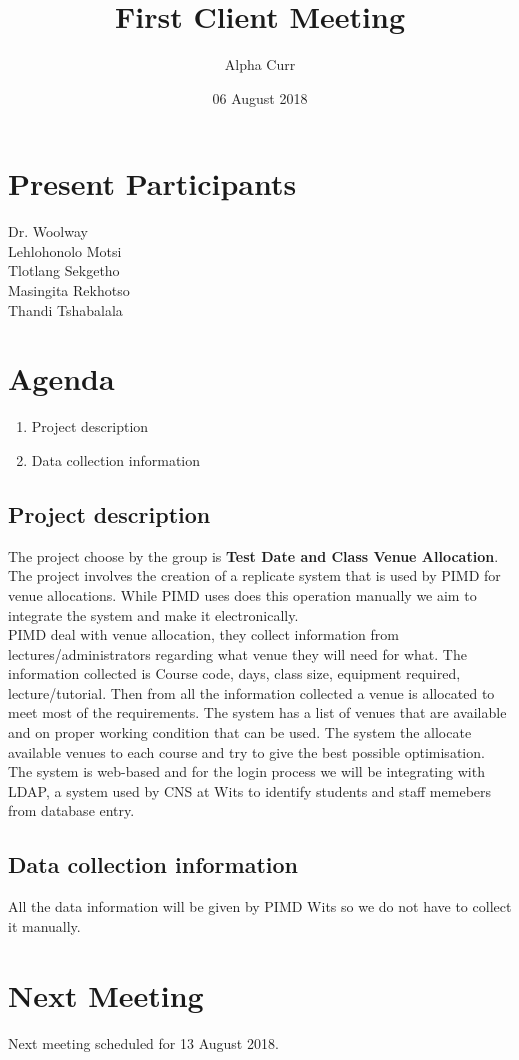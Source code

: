 \documentclass[11pt]{article}
\title{First Client Meeting}
\author{Alpha Curr}
\date{06 August 2018}
\begin{document}
\maketitle

\section{Present Participants}
Dr. Woolway \\
Lehlohonolo Motsi \\
Tlotlang Sekgetho \\
Masingita Rekhotso \\
Thandi Tshabalala

\section{Agenda}
\begin{enumerate}
\item Project description
\item Data collection information
\end{enumerate}

\subsection{Project description}
The project choose by the group is \textbf{Test Date and Class Venue Allocation}.\\
The project involves the creation of a replicate system that is used by PIMD for venue allocations. While PIMD uses does this operation manually we aim to integrate the system and make it electronically.\\
\newline
PIMD deal with venue allocation, they collect information from lectures/administrators regarding what venue they will need for what. The information collected is Course code, days, class size, equipment required, lecture/tutorial. Then from all the information collected a venue is allocated to meet most of the requirements. The system has a list of venues that are available and on proper working condition that can be used. The system the allocate available venues to each course and try to give the best possible optimisation.\\
The system is web-based and for the login process we will be integrating with LDAP, a system used by CNS at Wits to identify students and staff memebers from database entry.

\subsection{Data collection information}
All the data information will be given by PIMD Wits so we do not have to collect it manually.

\section{Next Meeting}
Next meeting scheduled for 13 August 2018.
\end{document}
